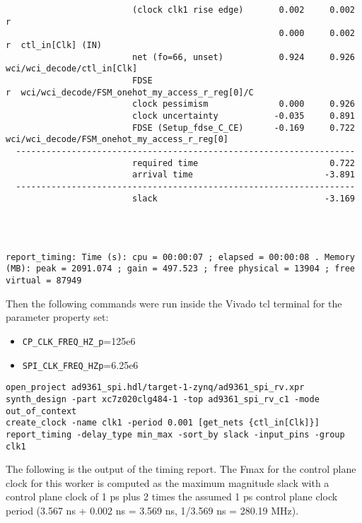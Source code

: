 \documentclass{article}
\begin{document}
\begin{lstlisting}
                         (clock clk1 rise edge)       0.002     0.002 r  
                                                      0.000     0.002 r  ctl_in[Clk] (IN)
                         net (fo=66, unset)           0.924     0.926    wci/wci_decode/ctl_in[Clk]
                         FDSE                                         r  wci/wci_decode/FSM_onehot_my_access_r_reg[0]/C
                         clock pessimism              0.000     0.926    
                         clock uncertainty           -0.035     0.891    
                         FDSE (Setup_fdse_C_CE)      -0.169     0.722    wci/wci_decode/FSM_onehot_my_access_r_reg[0]
  -------------------------------------------------------------------
                         required time                          0.722    
                         arrival time                          -3.891    
  -------------------------------------------------------------------
                         slack                                 -3.169    




report_timing: Time (s): cpu = 00:00:07 ; elapsed = 00:00:08 . Memory (MB): peak = 2091.074 ; gain = 497.523 ; free physical = 13904 ; free virtual = 87949
\end{lstlisting}
\fontsize{10}{12}\selectfont
Then the following commands were run inside the Vivado tcl terminal for the parameter property set:
\begin{itemize}
	\item \verb+CP_CLK_FREQ_HZ_p+=125e6
	\item \verb+SPI_CLK_FREQ_HZp+=6.25e6
\end{itemize}
\begin{lstlisting}
open_project ad9361_spi.hdl/target-1-zynq/ad9361_spi_rv.xpr
synth_design -part xc7z020clg484-1 -top ad9361_spi_rv_c1 -mode out_of_context
create_clock -name clk1 -period 0.001 [get_nets {ctl_in[Clk]}]
report_timing -delay_type min_max -sort_by slack -input_pins -group clk1
\end{lstlisting}
The following is the output of the timing report. The Fmax for the control plane clock for this worker is computed as the maximum magnitude slack with a control plane clock of 1 ps plus 2 times the assumed 1 ps control plane clock period (3.567 ns + 0.002 ns = 3.569 ns, 1/3.569 ns = 280.19 MHz).
\fontsize{6}{12}\selectfont
\end{document}
